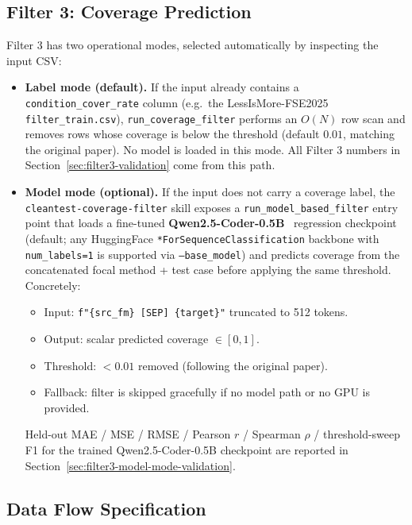 \documentclass[acmlarge,nonacm,screen]{acmart}
\begin{document}
\subsection{Filter 3: Coverage Prediction}

Filter 3 has two operational modes, selected automatically by
inspecting the input CSV:

\begin{itemize}
    \item \textbf{Label mode (default).} If the input already
        contains a \texttt{condition\_cover\_rate} column (e.g.\
        the LessIsMore-FSE2025 \texttt{filter\_train.csv}),
        \texttt{run\_coverage\_filter} performs an $O(N)$ row scan
        and removes rows whose coverage is below the threshold
        (default $0.01$, matching the original paper). No model is
        loaded in this mode. All Filter 3 numbers in
        Section~\ref{sec:filter3-validation} come from this path.
    \item \textbf{Model mode (optional).} If the input does not
        carry a coverage label, the
        \texttt{cleantest-coverage-filter} skill exposes a
        \texttt{run\_model\_based\_filter} entry point that loads a
        fine-tuned \textbf{Qwen2.5-Coder-0.5B}~\cite{hui2024qwen}
        regression checkpoint (default; any HuggingFace
        \texttt{*ForSequenceClassification} backbone with
        \texttt{num\_labels=1} is supported via
        \texttt{--base\_model}) and predicts coverage from the
        concatenated focal method + test case before applying the
        same threshold. Concretely:
    \begin{itemize}
        \item Input: \texttt{f"\{src\_fm\} [SEP] \{target\}"} truncated to 512 tokens.
        \item Output: scalar predicted coverage $\in [0, 1]$.
        \item Threshold: $< 0.01$ removed (following the original paper).
        \item Fallback: filter is skipped gracefully if no model path or no GPU is provided.
    \end{itemize}
        Held-out MAE / MSE / RMSE / Pearson $r$ / Spearman $\rho$ /
        threshold-sweep F1 for the trained Qwen2.5-Coder-0.5B
        checkpoint are reported in
        Section~\ref{sec:filter3-model-mode-validation}.
\end{itemize}

\subsection{Data Flow Specification}
\end{document}
